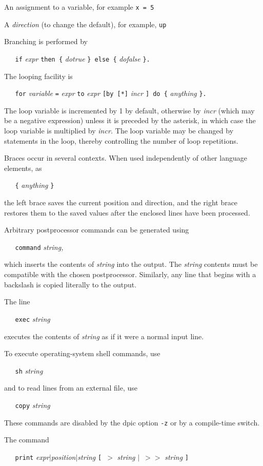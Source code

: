    An assignment to a variable, for example
{\tt x = 5}

   A
{\it direction}
(to change the default), for example,
{\tt up}

Branching is performed by

{\tt \ \ \ if}
{\it expr}
{\tt then\ \{}
{\it dotrue}
{\tt \}\ else\ \{}
{\it dofalse}
{\tt \}.}

The looping facility is

{\tt \ \ \ for}
{\it variable}
{\tt =}
{\it expr}
{\tt to}
{\it expr}
{\tt [by\ [*]}
{\it incr}
{\tt ]\ do\ \{}
{\it anything}
{\tt \}.}

The loop variable is incremented by 1 by default, otherwise by
{\it incr}
(which may be a negative expression)
unless it is preceded by the asterisk, in which case the loop variable
is multiplied by
{\it incr.}
The loop variable may be changed by statements in the loop, thereby
controlling the number of loop repetitions.

Braces occur in several contexts.
When used independently of other language elements, as

{\tt \ \ \ \{}
{\it anything}
{\tt \}}

the left brace
saves the current position and direction, and the right brace restores
them to the saved values after the enclosed lines have been processed.

Arbitrary postprocessor commands can be generated using

{\tt \ \ \ command}
{\it string,}

which inserts the contents of
{\it string}
into the output.
The
{\it string}
contents must be compatible with the chosen postprocessor.
Similarly, any line that begins with a backslash is copied literally
to the output.

The line

{\tt \ \ \ exec}
{\it string}

executes the contents of
{\it string}
as if it were a normal input line.

To execute operating-system shell commands, use

{\tt \ \ \ sh}
{\it string}

and to read lines from an external file, use

{\tt \ \ \ copy}
{\it string}

These commands are disabled by the
dpic
option
{\tt -z}
or by a compile-time switch.

The command

{\tt \ \ \ print}
{\it expr$|$position$|$string}
{\tt [\ $>$}
{\it string}
{\tt $|$\ $>$$>$}
{\it string}
{\tt ]}

